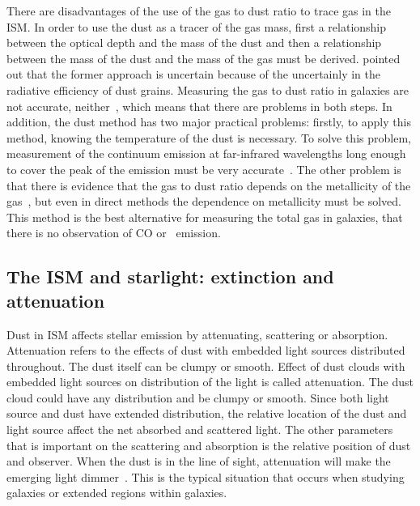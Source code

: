 There are disadvantages of the use of the gas to dust ratio to trace gas in the ISM.
In order to use the dust as a tracer of the gas mass, first a relationship between the optical depth and the mass of the dust and then a relationship between the mass of the dust and the mass of the gas must be derived.
\cite{Draine03} pointed out that the former approach is uncertain because of the uncertainly in the radiative efficiency of dust grains. 
Measuring the gas to dust ratio in galaxies are not accurate, neither~\citep{Hildebran83}, which means that there are problems in both steps. 
In addition, the dust method has two major practical problems: firstly, to apply this method, knowing the temperature of the dust is necessary. 
To solve this problem, measurement of the continuum emission at far-infrared wavelengths long enough to cover the peak of the emission must be very accurate~\citep{Ealas12}. 
The other problem is that there is evidence that the gas to dust ratio depends on the metallicity of the gas~\citep{Lisenfeld98, Draine07}, but even in direct methods the dependence on metallicity must be solved. 
This method is the best alternative for measuring the total gas in galaxies, that there is no observation of CO or \hi~emission. 

\subsection{The ISM and starlight: extinction and attenuation}
\label{sec: extinction}
Dust in ISM affects stellar emission by attenuating, scattering or absorption.
Attenuation refers to the effects of dust with embedded light sources distributed throughout. 
The dust itself can be clumpy or smooth. 
Effect of dust clouds with embedded light sources on distribution of the light is called attenuation.
The dust cloud could have any distribution and be clumpy or smooth.
Since both light source and dust have extended distribution, the relative location of the dust and light source affect the net absorbed and scattered light.
The other parameters that is important on  the scattering and absorption is the relative position of dust and observer.
When the dust is in the line of sight, attenuation will make the emerging light dimmer~\citep[e.g.][and references therein]{Calzetti13}.
This is the typical situation that occurs when studying galaxies or extended regions within galaxies.


